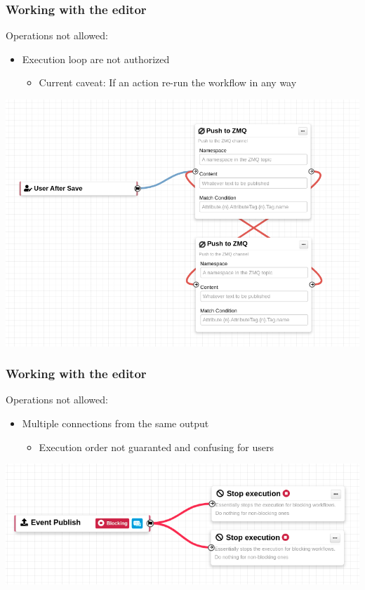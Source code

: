 \begin{frame}
    \frametitle{Working with the editor}
    Operations not allowed:
    \begin{itemize}
        \item Execution loop are not authorized
        \begin{itemize}
            \item Current caveat: If an action re-run the workflow in any way
        \end{itemize}
    \end{itemize}
    \begin{center}
        \includegraphics[width=0.7\linewidth]{pictures/editor-not-allowed-1.png}
    \end{center}
\end{frame}

\begin{frame}
    \frametitle{Working with the editor}
    Operations not allowed:
    \begin{itemize}
        \item Multiple connections from the same output
        \begin{itemize}
            \item Execution order not guaranted and confusing for users
        \end{itemize}
    \end{itemize}
    \begin{center}
        \includegraphics[width=0.7\linewidth]{pictures/editor-not-allowed-2.png}
    \end{center}
\end{frame}

